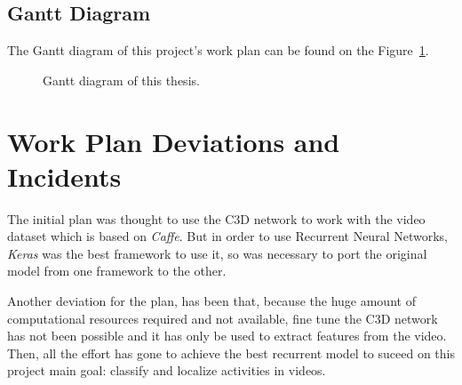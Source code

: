 \subsection{Gantt Diagram}

The Gantt diagram of this project's work plan can be found on the Figure~\ref{fig:gantt_diagram}.

\begin{figure}[H]
\begin{center}
\end{center}
\caption{Gantt diagram of this thesis.}
\label{fig:gantt_diagram}
\end{figure}

\section{Work Plan Deviations and Incidents}
\label{section:work_plan_deviations}

The initial plan was thought to use the C3D\cite{tran2014learning} network to work with the video dataset which is based on \textit{Caffe}. But in order to use Recurrent Neural Networks, \textit{Keras} was the best framework to use it, so was necessary to port the original model from one framework to the other.

Another deviation for the plan, has been that, because the huge amount of computational resources required and not available, fine tune the C3D network has not been possible and it has only be used to extract features from the video. Then, all the effort has gone to achieve the best recurrent model to suceed on this project main goal: classify and localize activities in videos.
